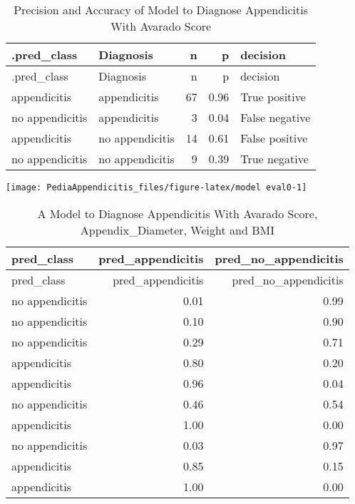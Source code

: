 \documentclass[
]{article}
\begin{document}
\begin{longtable}[]{@{}llrrl@{}}
\caption{Precision and Accuracy of Model to Diagnose Appendicitis With
Avarado Score}\tabularnewline
\toprule\noalign{}
.pred\_class & Diagnosis & n & p & decision \\
\midrule\noalign{}
\endfirsthead
\toprule\noalign{}
.pred\_class & Diagnosis & n & p & decision \\
\midrule\noalign{}
\endhead
\bottomrule\noalign{}
\endlastfoot
appendicitis & appendicitis & 67 & 0.96 & True positive \\
no appendicitis & appendicitis & 3 & 0.04 & False negative \\
appendicitis & no appendicitis & 14 & 0.61 & False positive \\
no appendicitis & no appendicitis & 9 & 0.39 & True negative \\
\end{longtable}

\begin{center}\texttt{[image: PediaAppendicitis\_files/figure-latex/model eval0-1]} \end{center}

\begin{longtable}[]{@{}lrr@{}}
\caption{A Model to Diagnose Appendicitis With Avarado Score,
Appendix\_Diameter, Weight and BMI}\tabularnewline
\toprule\noalign{}
pred\_class & pred\_appendicitis & pred\_no\_appendicitis \\
\midrule\noalign{}
\endfirsthead
\toprule\noalign{}
pred\_class & pred\_appendicitis & pred\_no\_appendicitis \\
\midrule\noalign{}
\endhead
\bottomrule\noalign{}
\endlastfoot
no appendicitis & 0.01 & 0.99 \\
no appendicitis & 0.10 & 0.90 \\
no appendicitis & 0.29 & 0.71 \\
appendicitis & 0.80 & 0.20 \\
appendicitis & 0.96 & 0.04 \\
no appendicitis & 0.46 & 0.54 \\
appendicitis & 1.00 & 0.00 \\
no appendicitis & 0.03 & 0.97 \\
appendicitis & 0.85 & 0.15 \\
appendicitis & 1.00 & 0.00 \\
\end{longtable}
\end{document}
